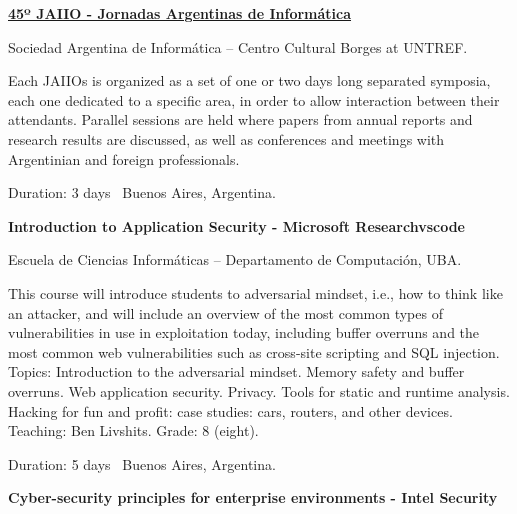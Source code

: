 \documentclass[letterpaper,MMMyyyy,nonstop]{simpleresumecv}
\begin{document}
\begin{body}
\BigGap

\href{http://45jaiio.sadio.org.ar/}{\textbf{45º JAIIO - Jornadas Argentinas de Informática}}
\hfill
{}

\BulletItem Sociedad Argentina de Informática – Centro Cultural Borges at UNTREF.
\begin{detail}
	\SubBulletItem
	Each JAIIOs is organized as a set of one or two days long separated symposia, each one dedicated to a specific area, in order to allow interaction between their attendants. Parallel sessions are held where papers from annual reports and research results are discussed, as well as conferences and meetings with Argentinian and foreign professionals.
\end{detail}
Duration: 3 days \SubBulletSymbol\, Buenos Aires, Argentina.

\BigGap

\textbf{Introduction to Application Security - Microsoft Researchvscode}
\hfill
{}

\BulletItem Escuela de Ciencias Informáticas – Departamento de Computación, UBA.
\begin{detail}
	\SubBulletItem
	This course will introduce students to adversarial mindset, i.e., how to think like an attacker, and will include an overview of the most common types of vulnerabilities in use in exploitation today, including buffer overruns and the most common web vulnerabilities such as cross-site scripting and SQL injection.
	\SubBulletItem
	Topics: Introduction to the adversarial mindset. Memory safety and buffer overruns. Web application security. Privacy. Tools for static and runtime analysis. Hacking for fun and profit: case studies: cars, routers, and other devices.
	\SubBulletItem
	Teaching: Ben Livshits.
	\SubBulletItem
	Grade: 8 (eight).
\end{detail}
Duration: 5 days \SubBulletSymbol\, Buenos Aires, Argentina.

\BigGap

\textbf{Cyber-security principles for enterprise environments - Intel Security}
\hfill
{}


\end{body}
\end{document}
